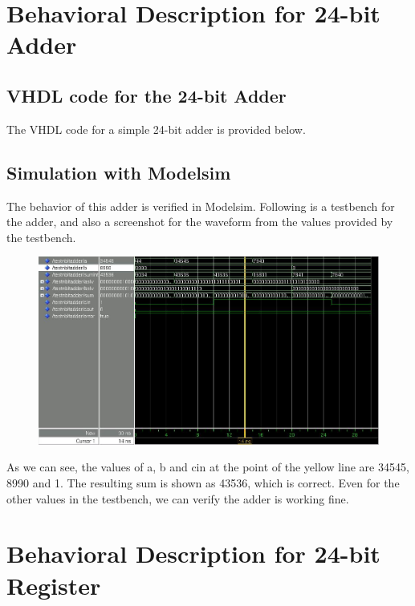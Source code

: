 \documentclass[11pt,a4paper]{article}
\begin{document}
\section{Behavioral Description for 24-bit Adder}

\subsection{VHDL code for the 24-bit Adder}
The VHDL code for a simple 24-bit adder is provided below.\\ 



\subsection{Simulation with Modelsim}
The behavior of this adder is verified in Modelsim. Following is a testbench for the adder, and also a screenshot for the waveform from the values provided by the testbench.



\begin{figure}[htp]
\centering
\includegraphics[width = 6in]{../source/wave.jpg}
\end{figure}

As we can see, the values of a, b and cin at the point of the yellow line are 34545, 8990 and 1. The resulting sum is shown as 43536, which is correct. Even for the other values in the testbench, we can verify the adder is working fine.

\section{Behavioral Description for 24-bit Register}
\end{document}
